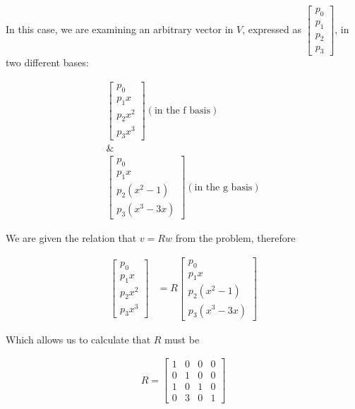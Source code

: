 \documentclass{article}
\begin{document}
		In this case, we are examining an arbitrary vector in $V$, expressed as $\begin{bmatrix} p_{0}\\p_{1}\\p_{2}\\p_{3}\end{bmatrix}$, in two different bases:
		
		\begin{align*}
			\begin{bmatrix}p_{0}\\p_{1}x\\p_{2}x^{2}\\p_{3}x^{3}\end{bmatrix}(\text{in the f basis})\\
			\&\\
			\begin{bmatrix}p_{0}\\p_{1}x\\p_{2}(x^{2}-1)\\p_{3}(x^{3}-3x)\end{bmatrix}(\text{in the g basis})
		\end{align*}
		
		We are given the relation that $v=Rw$ from the problem, therefore
		
		\begin{align*}
			\begin{bmatrix}p_{0}\\p_{1}x\\p_{2}x^{2}\\p_{3}x^{3}\end{bmatrix}&=R\begin{bmatrix}p_{0}\\p_{1}x\\p_{2}(x^{2}-1)\\p_{3}(x^{3}-3x)\end{bmatrix}
		\end{align*}
		
		Which allows us to calculate that $R$ must be 
		
		\begin{align*}
			R=
			\begin{bmatrix}
				1 & 0 & 0 & 0\\
				0 & 1 & 0 & 0\\
				1 & 0 & 1 & 0 \\
				0 & 3 & 0 & 1
			\end{bmatrix}
		\end{align*}
		
\end{document}
